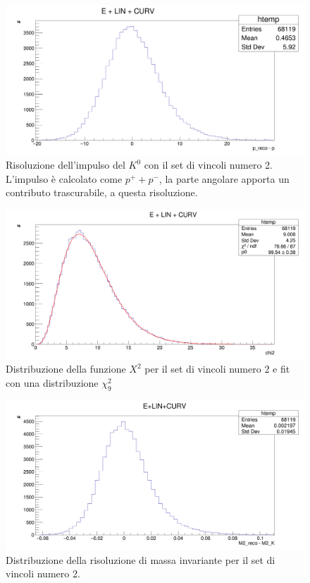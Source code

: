 \documentclass[8pt]{extarticle}
\begin{document}
\begin{figure}
	\begin{center}
		\includegraphics[scale=0.25]{set_2_p} 
		\caption{Risoluzione dell'impulso del $K^0$ con il set di vincoli numero 2. L'impulso è calcolato come $p^+ + p^-$, la parte angolare apporta un contributo trascurabile, a questa risoluzione.}
		\label{fig:set_2_p}
	\end{center}
\end{figure}

\begin{figure}
	\begin{center}
		\includegraphics[scale=0.25]{set_2_chi2} 
		\caption{Distribuzione della funzione $X^2$ per il set di vincoli numero 2 e fit con una distribuzione $\chi^2_9$}
		\label{fig:set_2_chi2}
	\end{center}
\end{figure}

\begin{figure}
	\begin{center}
		\includegraphics[scale=0.25]{set_2_inv} 
		\caption{Distribuzione della risoluzione di massa invariante per il set di vincoli numero 2.}
		\label{fig:set_2_inv}
	\end{center}
\end{figure}
\end{document}

